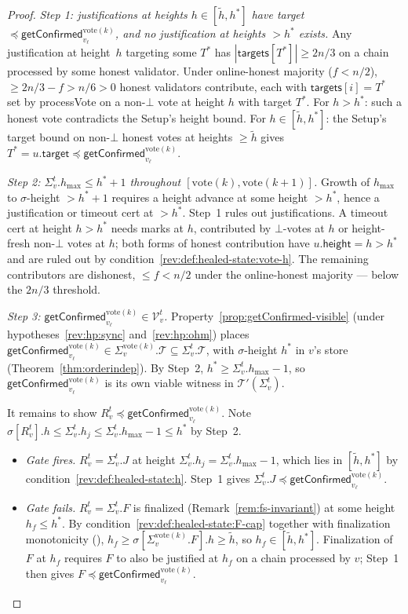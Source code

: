 \documentclass{article}
\newcommand{\T}[0]{\ensuremath{\mathcal{T}}}
\newcommand{\V}[0]{\ensuremath{\mathcal{V}}}
\newcommand{\target}{\mathsf{target}}
\newcommand{\height}{\mathsf{height}}
\newcommand{\targets}{\mathsf{targets}}
\newcommand{\hmax}{\ensuremath{h_{\max}}\xspace}
\newcommand{\processVote}{\textsf{processVote}\xspace}
\newcommand{\vote}{\ensuremath{\mathrm{vote}}}
\newcommand{\comm}[1]{\ensuremath{\widetilde{#1}}}
\newcommand{\getConfirmed}{\textsf{getConfirmed}\xspace}
\theoremstyle{plain}
\theoremstyle{definition}
\theoremstyle{remark}
\begin{document}
\begin{proof}
\medskip

\emph{Step 1: justifications at heights $h \in [\comm{h}, h^\ast]$ have target $\preceq \getConfirmed_{v_\ell}^{\vote(k)}$, and no justification at heights $> h^\ast$ exists.}
Any justification at height~$h$ targeting some $T^\ast$ has $|\targets[T^\ast]| \geq 2n/3$ on a chain processed by some honest validator.
Under online-honest majority ($f < n/2$), $\geq 2n/3 - f > n/6 > 0$ honest validators contribute, each with $\targets[i] = T^\ast$ set by \processVote{} on a non-$\bot$ vote at height $h$ with target $T^\ast$.
For $h > h^\ast$: such a honest vote contradicts the Setup's height bound.
For $h \in [\comm{h}, h^\ast]$: the Setup's target bound on non-$\bot$ honest votes at heights $\geq \comm{h}$ gives $T^\ast = u.\target \preceq \getConfirmed_{v_\ell}^{\vote(k)}$.

\emph{Step 2: $\Sigma_v^t.\hmax \leq h^\ast + 1$ throughout $[\vote(k), \vote(k{+}1)]$.}
Growth of $\hmax$ to $\sigma$-height $> h^\ast + 1$ requires a height advance at some height $> h^\ast$, hence a justification or timeout cert at $> h^\ast$.
Step~1 rules out justifications.
A timeout cert at height $h > h^\ast$ needs marks at $h$, contributed by $\bot$-votes at $h$ or height-fresh non-$\bot$ votes at $h$;
both forms of honest contribution have $u.\height = h > h^\ast$ and are ruled out by condition~\ref{rev:def:healed-state:vote-h}.
The remaining contributors are dishonest, $\leq f < n/2$ under the online-honest majority --- below the $2n/3$ threshold.

\emph{Step 3: $\getConfirmed_{v_\ell}^{\vote(k)} \in \V_v^t$.}
Property~\ref{prop:getConfirmed-visible} (under hypotheses~\ref{rev:hp:sync} and~\ref{rev:hp:ohm}) places $\getConfirmed_{v_\ell}^{\vote(k)} \in \Sigma_v^{\vote(k)}.\T \subseteq \Sigma_v^t.\T$, with $\sigma$-height $h^\ast$ in $v$'s store (Theorem~\ref{thm:orderindep}).
By Step~2, $h^\ast \geq \Sigma_v^t.\hmax - 1$, so $\getConfirmed_{v_\ell}^{\vote(k)}$ is its own viable witness in $\T'(\Sigma_v^t)$.

It remains to show $R_v^t \preceq \getConfirmed_{v_\ell}^{\vote(k)}$.
Note $\sigma[R_v^t].h \leq \Sigma_v^t.h_j \leq \Sigma_v^t.\hmax - 1 \leq h^\ast$ by Step~2.
\begin{itemize}
  \item \emph{Gate fires.} $R_v^t = \Sigma_v^t.J$ at height $\Sigma_v^t.h_j = \Sigma_v^t.\hmax - 1$, which lies in $[\comm{h}, h^\ast]$ by condition~\ref{rev:def:healed-state:h}.
  Step~1 gives $\Sigma_v^t.J \preceq \getConfirmed_{v_\ell}^{\vote(k)}$.
  \item \emph{Gate fails.} $R_v^t = \Sigma_v^t.F$ is finalized (Remark~\ref{rem:fs-invariant}) at some height $h_f \leq h^\ast$.
  By condition~\ref{rev:def:healed-state:F-cap} together with finalization monotonicity (), $h_f \geq \sigma[\Sigma_v^{\vote(k)}.F].h \geq \comm{h}$, so $h_f \in [\comm{h}, h^\ast]$.
  Finalization of $F$ at $h_f$ requires $F$ to also be justified at $h_f$ on a chain processed by $v$;
  Step~1 then gives $F \preceq \getConfirmed_{v_\ell}^{\vote(k)}$.
\end{itemize}


\end{proof}
\end{document}

